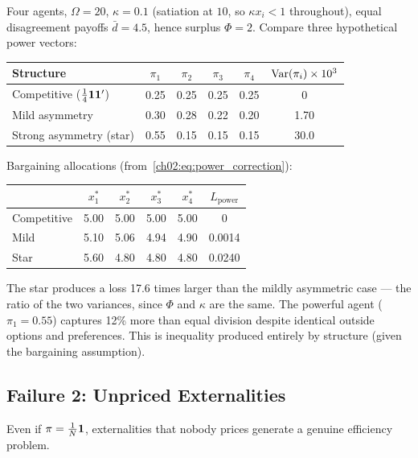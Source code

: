 \documentclass[../structural_economics_book.tex]{subfiles}
\begin{document}
\begin{example}[Power Asymmetry with $N = 4$]\label{ch02:ex:power_4}
Four agents, $\Omega = 20$, $\kappa = 0.1$ (satiation at $10$, so $\kappa x_i < 1$ throughout), equal disagreement payoffs $\bar d = 4.5$, hence surplus $\Phi = 2$. Compare three hypothetical power vectors:

\begin{center}
\begin{tabular}{lccccc}
\toprule
Structure & $\pi_1$ & $\pi_2$ & $\pi_3$ & $\pi_4$ & $\operatorname{Var}(\pi_i) \times 10^3$ \\
\midrule
Competitive ($\frac{1}{4}\mathbf{1}\mathbf{1}'$) & 0.25 & 0.25 & 0.25 & 0.25 & 0 \\
Mild asymmetry & 0.30 & 0.28 & 0.22 & 0.20 & 1.70 \\
Strong asymmetry (star) & 0.55 & 0.15 & 0.15 & 0.15 & 30.0 \\
\bottomrule
\end{tabular}
\end{center}

Bargaining allocations (from~\eqref{ch02:eq:power_correction}):

\begin{center}
\begin{tabular}{lcccc|c}
\toprule
& $x_1^*$ & $x_2^*$ & $x_3^*$ & $x_4^*$ & $L_{\text{power}}$ \\
\midrule
Competitive & 5.00 & 5.00 & 5.00 & 5.00 & 0 \\
Mild & 5.10 & 5.06 & 4.94 & 4.90 & 0.0014 \\
Star & 5.60 & 4.80 & 4.80 & 4.80 & 0.0240 \\
\bottomrule
\end{tabular}
\end{center}

The star produces a loss 17.6 times larger than the mildly asymmetric case --- the ratio of the two variances, since $\Phi$ and $\kappa$ are the same. The powerful agent ($\pi_1 = 0.55$) captures 12\% more than equal division despite identical outside options and preferences. This is inequality produced entirely by structure (given the bargaining assumption).
\end{example}


\subsection{Failure 2: Unpriced Externalities}

Even if $\pi = \frac{1}{N}\mathbf{1}$, externalities that nobody prices generate a genuine efficiency problem.
\end{document}
